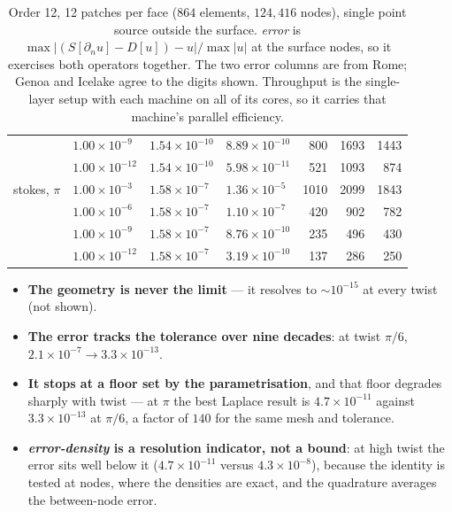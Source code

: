 \documentclass[11pt]{article}
\begin{document}
\begin{table}[H]
\begin{tabular}{@{}llllrrr@{}}
 & $1.00\!\times\!10^{-9}$ & $1.54\!\times\!10^{-10}$ & $8.89\!\times\!10^{-10}$ & 800 & 1693 & 1443 \\
 & $1.00\!\times\!10^{-12}$ & $1.54\!\times\!10^{-10}$ & $5.98\!\times\!10^{-11}$ & 521 & 1093 & 874 \\
\addlinespace
stokes, $\pi$ & $1.00\!\times\!10^{-3}$ & $1.58\!\times\!10^{-7}$ & $1.36\!\times\!10^{-5}$ & 1010 & 2099 & 1843 \\
 & $1.00\!\times\!10^{-6}$ & $1.58\!\times\!10^{-7}$ & $1.10\!\times\!10^{-7}$ & 420 & 902 & 782 \\
 & $1.00\!\times\!10^{-9}$ & $1.58\!\times\!10^{-7}$ & $8.76\!\times\!10^{-10}$ & 235 & 496 & 430 \\
 & $1.00\!\times\!10^{-12}$ & $1.58\!\times\!10^{-7}$ & $3.19\!\times\!10^{-10}$ & 137 & 286 & 250 \\
\bottomrule
\end{tabular}
\caption{Order 12, 12 patches per face ($864$ elements, $124{,}416$ nodes), single point source outside
the surface. \emph{error} is $\max|(S[\partial_n
u]-D[u])-u|/\max|u|$ at the surface nodes, so it exercises both operators together. The two
error columns are from Rome; Genoa and Icelake agree to the digits shown. Throughput is the
single-layer setup with each machine on all of its cores, so it carries that machine's parallel
efficiency.}
\end{table}

\begin{itemize}\setlength\itemsep{1pt}
\item \textbf{The geometry is never the limit} --- it resolves to $\sim10^{-15}$ at every twist
      (not shown).
\item \textbf{The error tracks the tolerance over nine decades}: at twist $\pi/6$,
      $2.1\times10^{-7}\!\to\!3.3\times10^{-13}$.
\item \textbf{It stops at a floor set by the parametrisation}, and that floor degrades sharply
      with twist --- at $\pi$ the best Laplace result is $4.7\times10^{-11}$ against
      $3.3\times10^{-13}$ at $\pi/6$, a factor of $140$ for the same mesh and tolerance.
\item \textbf{\emph{error-density} is a resolution indicator, not a bound}: at high twist the
      error sits well below it ($4.7\times10^{-11}$ versus $4.3\times10^{-8}$), because the
      identity is tested at nodes, where the densities are exact, and the quadrature averages the
      between-node error.
\end{itemize}
\end{document}
